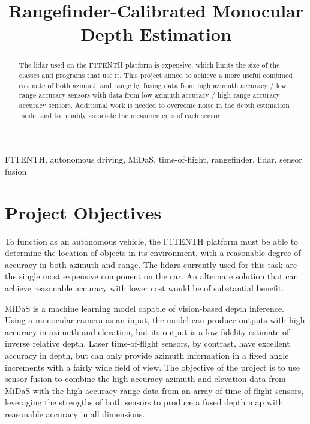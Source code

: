 \documentclass[conference]{IEEEtran}
\begin{document}
\title{Rangefinder-Calibrated Monocular Depth Estimation}

\author{
\and
\and
\and
}

\maketitle

\begin{abstract}
The lidar used on the F1TENTH platform is expensive, which limits the size of
the classes and programs that use it. This project aimed to achieve a more
useful combined estimate of both azimuth and range by fusing data from high
azimuth accuracy / low range accuracy sensors with data from low azimuth
accuracy / high range accuracy accuracy sensors. Additional work is needed to
overcome noise in the depth estimation model and to reliably associate the
measurements of each sensor.
\end{abstract}

\begin{IEEEkeywords}
F1TENTH, autonomous driving, MiDaS, time-of-flight, rangefinder, lidar, sensor
fusion
\end{IEEEkeywords}

\section{Project Objectives}
To function as an autonomous vehicle, the F1TENTH platform must be able to
determine the location of objects in its environment, with a reasonable degree
of accuracy in both azimuth and range. The lidars currently used for this task
are the single most expensive component on the car. An alternate solution that
can achieve reasonable accuracy with lower cost would be of substantial
benefit.

MiDaS is a machine learning model capable of vision-based depth inference.
Using a monocular camera as an input, the model can produce outputs with high
accuracy in azimuth and elevation, but its output is a low-fidelity estimate of
inverse relative depth. Laser time-of-flight sensors, by contrast, have
excellent accuracy in depth, but can only provide azimuth information in a
fixed angle increments with a fairly wide field of view. The objective of the
project is to use sensor fusion to combine the high-accuracy azimuth and
elevation data from MiDaS with the high-accuracy range data from an array of
time-of-flight sensors, leveraging the strengths of both sensors to produce a
fused depth map with reasonable accuracy in all dimensions.
\end{document}
